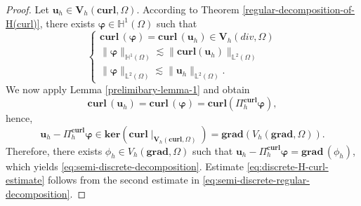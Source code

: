 \begin{proof}
Let $\bm{u}_h \in \bm{V}_h(\textbf{curl},\Omega)$. According to Theorem \ref{regular-decomposition-of-H(curl)}, there exists $\bm{\varphi} \in \mathbb{H}^1(\Omega)$ such that
\begin{equation}\label{eq:semi-discrete-regular-decomposition}
\begin{cases}
\textbf{curl}\,(\bm{\varphi})=\textbf{curl}\,(\bm{u}_h) \in \bm{V}_h(div,\Omega)\\
\|\bm{\varphi}\|_{\mathbb{H}^1(\Omega)} \lesssim \|\textbf{curl}(\bm{u}_h)\|_{\mathbb{L}^2(\Omega)}\\
\|\bm{\varphi}\|_{\mathbb{L}^2(\Omega)} \lesssim \|\bm{u}_h\|_{\mathbb{L}^2(\Omega)}.
\end{cases}
\end{equation}
We now apply Lemma  \eqref{prelimibary-lemma-1} and obtain
$$
\textbf{curl}\,(\bm{u}_h)=\textbf{curl}\,(\bm{\varphi})=\textbf{curl}\left( \Pi_h^{\textbf{curl}} \bm{\varphi}\right),
$$
hence, 
$$\bm{u}_h - \Pi_h^{\textbf{curl}} \bm{\varphi} \in \textbf{ker}\left(\textbf{curl} \mid_{\bm{V}_h(\textbf{curl},\Omega)} \right)=\textbf{grad} \left( V_h(\textbf{grad},\Omega)\right).$$ 
Therefore, there exists $\phi_h \in V_h(\textbf{grad},\Omega)$  such that $\bm{u}_h - \Pi_h^{\textbf{curl}} \bm{\varphi}=\textbf{grad}\,(\phi_h)$,  which yields \eqref{eq:semi-discrete-decomposition}.  Estimate \eqref{eq:discrete-H-curl-estimate} follows from the second estimate in \eqref{eq:semi-discrete-regular-decomposition}.


\end{proof}
